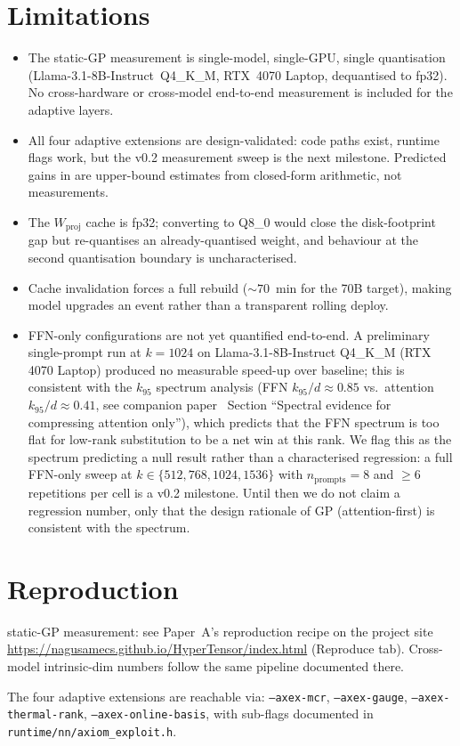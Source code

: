\documentclass[11pt]{article}
\begin{document}
\section{Limitations}
\label{sec:limitations}
\label{sec:limits}
\begin{itemize}
\item The static-GP measurement is single-model, single-GPU, single
quantisation (Llama-3.1-8B-Instruct~Q4\_K\_M, RTX~4070 Laptop, dequantised
to fp32).  No cross-hardware or cross-model end-to-end measurement is
included for the adaptive layers.
\item All four adaptive extensions are design-validated: code paths
exist, runtime flags work, but the v0.2 measurement sweep is the next
milestone.  Predicted gains in 
are upper-bound estimates from closed-form arithmetic, not measurements.
\item The $W_\text{proj}$ cache is fp32; converting to Q8\_0
\cite{ggerganov2023kquants} would close the disk-footprint gap but
re-quantises an already-quantised weight, and behaviour at the second
quantisation boundary is uncharacterised.
\item Cache invalidation forces a full rebuild ($\sim 70$~min for the 70B
target), making model upgrades an event rather than a transparent rolling
deploy.
\item FFN-only configurations are not yet quantified end-to-end.
A preliminary single-prompt run at $k{=}1024$ on Llama-3.1-8B-Instruct
Q4\_K\_M (RTX 4070 Laptop) produced no measurable speed-up over
baseline; this is consistent with the $k_{95}$ spectrum analysis (FFN
$k_{95}/d{\approx}0.85$ vs.\ attention $k_{95}/d{\approx}0.41$, see
companion paper~\cite{stewart2026grc} Section ``Spectral evidence for
compressing attention only''), which predicts that the FFN spectrum is
too flat for low-rank substitution to be a net win at this rank. We
flag this as the spectrum predicting a null result rather than a
characterised regression: a full FFN-only sweep at
$k\in\{512, 768, 1024, 1536\}$ with $n_\text{prompts}{=}8$ and
$\geq 6$ repetitions per cell is a v0.2 milestone. Until then we do
not claim a regression number, only that the design rationale of GP
(attention-first) is consistent with the spectrum.
\end{itemize}

\section{Reproduction}
\label{sec:repro}
static-GP measurement: see Paper~A's reproduction recipe on the project site
\url{https://nagusamecs.github.io/HyperTensor/index.html} (Reproduce tab).
Cross-model intrinsic-dim numbers follow the same pipeline documented there.

The four adaptive extensions are reachable via:
\texttt{--axex-mcr}, \texttt{--axex-gauge}, \texttt{--axex-thermal-rank},
\texttt{--axex-online-basis}, with sub-flags documented in
\texttt{runtime/nn/axiom\_exploit.h}.

\section*{}

\clearpage
\printbibliography
\end{document}
